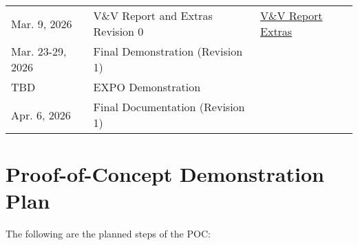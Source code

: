 \documentclass{article}
\begin{document}
\begin{table}[h]
\begin{tabularx}{\textwidth}{llX}
    Mar. 9, 2026     & V\&V Report and Extras Revision 0             & \href{https://github.com/ZifanSi/vision-guided-tracker/blob/main/docs/VnVReport/VnVReport.pdf}{V\&V Report}   \newline
    \href{https://github.com/ZifanSi/vision-guided-tracker/tree/main/docs/Extras}{Extras}
    \\
    Mar. 23-29, 2026 & Final Demonstration (Revision 1)              &                                                                                                                                                  \\
    TBD              & EXPO Demonstration                            &                                                                                                                                                  \\
    Apr. 6, 2026     & Final Documentation (Revision 1)              &                                                                                                                                                  \\
    \bottomrule
  \end{tabularx}
\end{table}
\FloatBarrier


\section{Proof-of-Concept Demonstration Plan}

The following are the planned steps of the POC:
\end{document}
